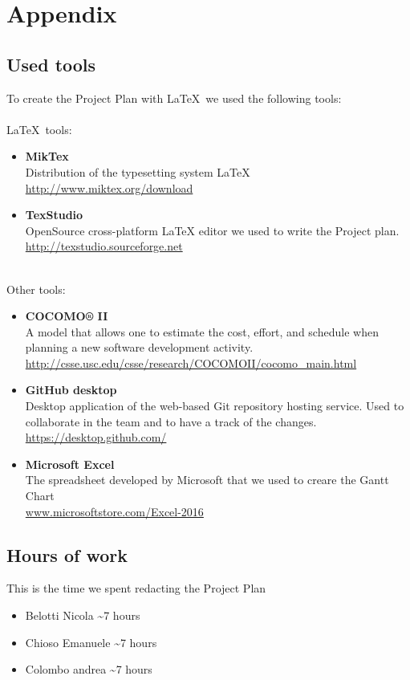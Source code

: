 \section{Appendix}
\subsection{Used tools}

To create the Project Plan with \LaTeX\ we used the following tools: \hfill \\
\\ \hfill
\LaTeX\ tools:
\begin{itemize}
	\item \textbf{MikTex} \\ Distribution of the typesetting system LaTeX \\ \url{http://www.miktex.org/download } 
	\item \textbf{TexStudio}\\ OpenSource cross-platform LaTeX editor we used to write the Project plan. \\ \url{http://texstudio.sourceforge.net  } 
\end{itemize} \hfill \\ 
Other tools:
\begin{itemize}
	\item \textbf{COCOMO® II} \\A model that allows one to estimate the cost, effort, and schedule when planning a new software development activity. 
	\\ \url{http://csse.usc.edu/csse/research/COCOMOII/cocomo_main.html}
	\item \textbf{GitHub desktop}\\ Desktop application of the web-based Git repository hosting service. Used to collaborate in the team and to have a track of the changes.  \\ \url{https://desktop.github.com/ } 
	\item \textbf{Microsoft Excel}\\ The spreadsheet developed by Microsoft that we used to creare the Gantt Chart \\ \url{www.microsoftstore.com/Excel-2016‎
}
\end{itemize} 

\subsection{Hours of work}
This is the time we spent redacting the Project Plan 
\begin{itemize}
	\item {Belotti Nicola} \textasciitilde 7 hours
	\item {Chioso Emanuele} \textasciitilde 7 hours
	\item {Colombo andrea} \textasciitilde 7 hours
\end{itemize}